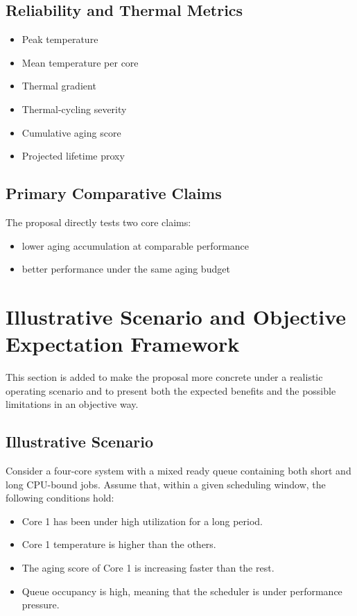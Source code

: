 \documentclass[12pt,a4paper]{article}
\begin{document}
\subsection{Reliability and Thermal Metrics}

\begin{itemize}[leftmargin=*]
\item Peak temperature
\item Mean temperature per core
\item Thermal gradient
\item Thermal-cycling severity
\item Cumulative aging score
\item Projected lifetime proxy
\end{itemize}

\subsection{Primary Comparative Claims}

The proposal directly tests two core claims:

\begin{itemize}[leftmargin=*]
\item lower aging accumulation at comparable performance
\item better performance under the same aging budget
\end{itemize}

\section{Illustrative Scenario and Objective Expectation Framework}

This section is added to make the proposal more concrete under a realistic operating scenario and to present both
the expected benefits and the possible limitations in an objective way.

\subsection{Illustrative Scenario}

Consider a four-core system with a mixed ready queue containing both short and long CPU-bound jobs. Assume that,
within a given scheduling window, the following conditions hold:

\begin{itemize}[leftmargin=*]
\item Core 1 has been under high utilization for a long period.
\item Core 1 temperature is higher than the others.
\item The aging score of Core 1 is increasing faster than the rest.
\item Queue occupancy is high, meaning that the scheduler is under performance pressure.
\end{itemize}
\end{document}
